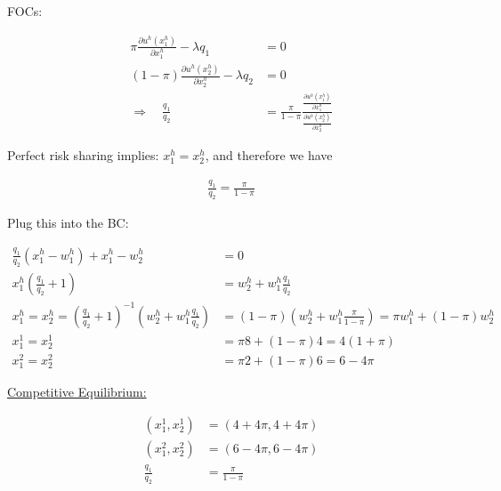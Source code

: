 {\begin{enumerate}[label=(\alph*)]
{FOCs:

\begin{align*}
    \pi \frac{\partial u^{h}\left(x_{1}^{h}\right)}{\partial x_{1}^{h}}-\lambda q_{1}&=0 \\
    (1-\pi) \frac{\partial u^{h}\left(x_{2}^{h}\right)}{\partial x_{2}^{h}}-\lambda q_{2} &= 0 \\
    \Longrightarrow \quad \frac{q_{1}}{q_{2}} &= \frac{\pi}{1-\pi} \frac{\frac{\partial u^{h}\left(x_{1}^{h}\right)}{\partial x_{1}^{h}}}{\frac{\partial u^{h}\left(x_{2}^{h}\right)}{\partial x_{2}^{h}}}
\end{align*}

Perfect risk sharing implies: $x_{1}^{h} = x_{2}^{h}$, and therefore we have 

\begin{align*}
    \frac{q_1}{q_2}=\frac{\pi}{1-\pi}
\end{align*}

Plug this into the BC:

\begin{align*}
    \frac{q_{1}}{q_{2}}\left(x_{1}^{h}-w_{1}^{h}\right)+x_{1}^{h}-w_{2}^{h} &= 0 \\
    x_{1}^{h}\left(\frac{q_{1}}{q_{2}}+1\right) &= w_{2}^{h}+w_{1}^{h} \frac{q_{1}}{q_{2}} \\
    x_{1}^{h}=x_{2}^{h}=\left(\frac{q_{1}}{q_{2}}+1\right)^{-1}\left(w_{2}^{h}+w_{1}^{h} \frac{q_{1}}{q_{2}}\right) 
    &= (1-\pi)\left(w_{2}^{h}+w_{1}^{h} \frac{\pi}{1-\pi}\right) 
    =\pi w_{1}^{h}+(1-\pi) w_{2}^{h} \\
    x_{1}^1=x_{2}^1 &= \pi 8+(1-\pi) 4=4(1+\pi) \\
    x_{1}^{2}=x_{2}^{2} &= \pi 2+(1-\pi) 6=6-4 \pi
\end{align*}

\underline{Competitive Equilibrium: }

\begin{align*}
    \left(x_1^1, x_2^1\right) & =(4+4 \pi, 4+4 \pi) \\
    \left(x_1^2, x_2^2\right) & =(6-4 \pi, 6-4 \pi) \\
    \frac{q_1}{q_2} & =\frac{\pi}{1-\pi}
\end{align*}
}
\end{enumerate}
}